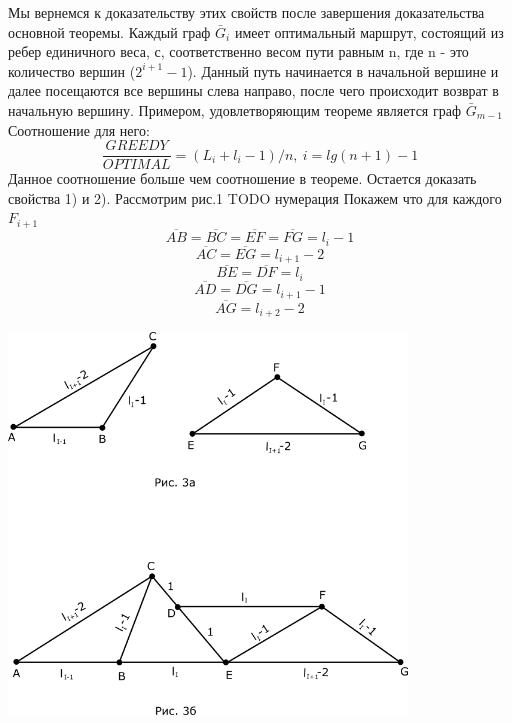 \documentclass[a4paper, 14pt]{extarticle}
\begin{document}
Мы вернемся к доказательству этих свойств после завершения доказательства основной теоремы.
Каждый граф $\bar G_i$ имеет оптимальный маршрут, состоящий из ребер единичного веса, с, соответственно весом пути равным n, где n - это количество вершин ($2^{i+1}-1$). Данный путь начинается в начальной вершине и далее посещаются все вершины слева направо, после чего происходит возврат в начальную вершину. Примером, удовлетворяющим теореме является граф $\bar G_{m-1}$ Соотношение для него:
\begin{equation}
\frac{GREEDY}{OPTIMAL} = (L_i+l_i-1)/n, \:  i=lg(n+1)-1
\end{equation}
Данное соотношение больше чем соотношение в теореме.
Остается доказать свойства 1) и 2).
Рассмотрим рис.1 TODO нумерация
Покажем что для каждого $F_{i+1}$
\begin{equation}\label{2.13}
\overline {AB}= \overline {BC}= \overline {EF}=\overline {FG}=l_i-1
\end{equation}
\begin{equation}\label{2.14}
\overline {AC}= \overline {EG}=l_{i+1}-2
\end{equation}
\begin{equation}\label{2.15}
\overline {BE}= \overline {DF}=l_i
\end{equation}
\begin{equation}\label{2.16}
\overline {AD}= \overline {DG}=l_{i+1}-1
\end{equation}
\begin{equation}\label{2.17}
\overline {AG}=l_{i+2}-2
\end{equation}

\begin{center}
\includegraphics[width=300pt]{ris3.png}
\end{center}
\end{document}

